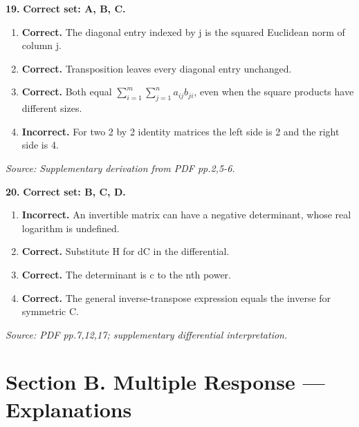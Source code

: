 \documentclass[11pt,a4paper]{article}
\begin{document}
\par\noindent\begin{minipage}{\linewidth}
\textbf{19.} \textbf{Correct set: A, B, C.}
\begin{enumerate}[label=(\Alph*),leftmargin=8mm,itemsep=2pt,topsep=2pt]
\item \textbf{Correct.} The diagonal entry indexed by j is the squared Euclidean norm of column j.
\item \textbf{Correct.} Transposition leaves every diagonal entry unchanged.
\item \textbf{Correct.} Both equal \(\sum_{i=1}^m\sum_{j=1}^n a_{ij}b_{ji}\), even when the square products have different sizes.
\item \textbf{Incorrect.} For two 2 by 2 identity matrices the left side is 2 and the right side is 4.
\end{enumerate}
{\footnotesize\textit{Source: Supplementary derivation from PDF pp.2,5-6.}}

\end{minipage}\par\vspace{3mm}
\par\noindent\begin{minipage}{\linewidth}
\textbf{20.} \textbf{Correct set: B, C, D.}
\begin{enumerate}[label=(\Alph*),leftmargin=8mm,itemsep=2pt,topsep=2pt]
\item \textbf{Incorrect.} An invertible matrix can have a negative determinant, whose real logarithm is undefined.
\item \textbf{Correct.} Substitute H for dC in the differential.
\item \textbf{Correct.} The determinant is c to the nth power.
\item \textbf{Correct.} The general inverse-transpose expression equals the inverse for symmetric C.
\end{enumerate}
{\footnotesize\textit{Source: PDF pp.7,12,17; supplementary differential interpretation.}}

\end{minipage}\par\vspace{3mm}
\newpage\section*{Section B. Multiple Response --- Explanations}
\end{document}
